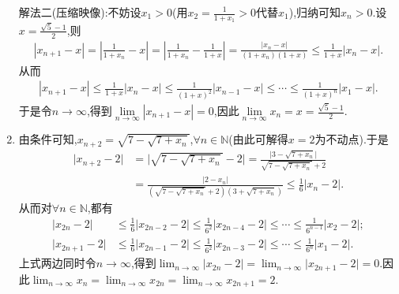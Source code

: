 \documentclass[../../main.tex]{subfiles}
\begin{document}
\begin{solution}
\begin{enumerate}
{\color{blue}解法二(压缩映像):}不妨设$x_1>0$(用$x_2=\frac{1}{1+x_1}>0$代替$x_1$),归纳可知$x_n>0$.设$x=\frac{\sqrt{5}-1}{2}$,则
\begin{align*}
\left| x_{n+1}-x \right|=\left| \frac{1}{1+x_n}-x \right|=\left| \frac{1}{1+x_n}-\frac{1}{1+x} \right|=\frac{\left| x_n-x \right|}{\left( 1+x_n \right) \left( 1+x \right)}\leqslant \frac{1}{1+x}\left| x_n-x \right|.
\end{align*}
从而
\begin{align*}
\left| x_{n+1}-x \right|\leqslant \frac{1}{1+x}\left| x_n-x \right|\leqslant \frac{1}{\left( 1+x \right) ^2}\left| x_{n-1}-x \right|\leqslant \cdots \leqslant \frac{1}{\left( 1+x \right) ^n}\left| x_1-x \right|.
\end{align*}
于是令$n\to\infty$,得到$\underset{n\rightarrow \infty}{\lim}\left| x_{n+1}-x \right|=0$,因此$\underset{n\rightarrow \infty}{\lim}x_n=x=\frac{\sqrt{5}-1}{2}$.

\item 由条件可知,\(x_{n + 2}=\sqrt{7-\sqrt{7 + x_n}}\),\(\forall n\in\mathbb{N}\)(由此可解得\(x = 2\)为不动点).于是
\begin{align*}
\vert x_{n + 2}-2\vert&=\vert\sqrt{7-\sqrt{7 + x_n}}-2\vert
=\frac{\vert 3-\sqrt{7 + x_n}\vert}{\sqrt{7-\sqrt{7 + x_n}}+2}\\
&=\frac{\vert 2 - x_n\vert}{(\sqrt{7-\sqrt{7 + x_n}}+2)(3+\sqrt{7 + x_n})}
\leqslant\frac{1}{6}\vert x_n - 2\vert.
\end{align*}
从而对$\forall n \in \mathbb{N}$,都有
\begin{align*}
\vert x_{2n}-2\vert&\leqslant\frac{1}{6}\vert x_{2n - 2}-2\vert\leqslant\frac{1}{6^2}\vert x_{2n - 4}-2\vert\leqslant\cdots\leqslant\frac{1}{6^{n - 1}}\vert x_2 - 2\vert;\\
\vert x_{2n + 1}-2\vert&\leqslant\frac{1}{6}\vert x_{2n - 1}-2\vert\leqslant\frac{1}{6^2}\vert x_{2n - 3}-2\vert\leqslant\cdots\leqslant\frac{1}{6^n}\vert x_1 - 2\vert.
\end{align*}
上式两边同时令\(n\rightarrow\infty\),得到\(\lim_{n\rightarrow\infty}\vert x_{2n}-2\vert=\lim_{n\rightarrow\infty}\vert x_{2n + 1}-2\vert = 0\).因此\(\lim_{n\rightarrow\infty}x_n=\lim_{n\rightarrow\infty}x_{2n}=\lim_{n\rightarrow\infty}x_{2n + 1}=2\).
\end{enumerate}

\end{solution}
\end{document}
